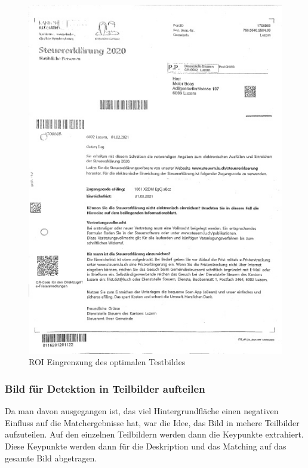 \begin{figure}[H]
\begin{minipage}[t]{0.32\linewidth}
  \includegraphics[width=1.0\textwidth]{img/piktogrammerkennung/scanned_doc.jpg}
  \caption{ROI Eingrenzung des optimalen Testbildes}
  \label{fig:scanned-doc}
  \end{minipage}
\end{figure}

\subsubsection{Bild für Detektion in Teilbilder aufteilen}
\label{sec:detektion-auf-teilbildern}
Da man davon ausgegangen ist, das viel Hintergrundfläche einen negativen Einfluss auf die Matchergebnisse hat, war die Idee, das Bild in mehere Teilbilder aufzuteilen. Auf den einzelnen Teilbildern werden dann die Keypunkte extrahiert. Diese Keypunkte werden dann für die Deskription und das Matching auf das gesamte Bild abgetragen.

